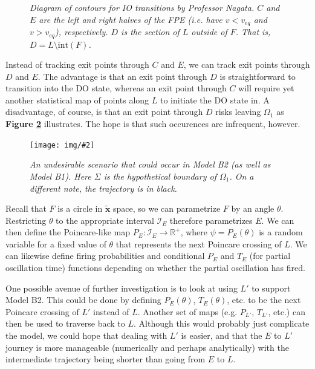 \documentclass[letterpaper,12pt]{article}
\numberwithin{table}{section}
\numberwithin{figure}{section}
\numberwithin{equation}{section}
\newcommand{\centerfig}[2]{\begin{center}\texttt{[image: img/\#2]}\end{center}}
\newcommand{\ccaption}[1]{\caption{\textit{#1}}}
\newcommand{\reffig}[1]{\textbf{Figure \ref{#1}}}
\begin{document}
\begin{flushleft}
\begin{figure}[h]
        \captionsetup{width=0.9\linewidth}
        \ccaption{Diagram of contours for IO transitions by Professor Nagata. $C$ and $E$ are the left and right halves of the FPE (i.e. have $v < v_{eq}$ and $v > v_{eq}$), respectively. $D$ is the section of $L$ outside of $F$. That is, $D = L \setminus \text{int}(F)$.}
        \label{fig:fpe-dissect}
    
    \end{figure}
    
    Instead of tracking exit points through $C$ and $E$, we can track exit points through $D$ and $E$. The advantage is that an exit point through $D$ is straightforward to transition into the DO state, whereas an exit point through $C$ will require yet another statistical map of points along $L$ to initiate the DO state in. A disadvantage, of course, is that an exit point through $D$ risks leaving $\Omega_1$ as \reffig{fig:modelb2-fpe-fail} illustrates. The hope is that such occurences are infrequent, however.
    \begin{figure}[h]

        \centering
 
        \centerfig{0.8}{modelb2-fpe-fail.jpg}
    
        \captionsetup{width=0.8\linewidth}
        \ccaption{An undesirable scenario that could occur in Model B2 (as well as Model B1). Here $\Sigma$ is the hypothetical boundary of $\Omega_1$. On a different note, the trajectory is in black.}
        \label{fig:modelb2-fpe-fail}
    
    \end{figure}

    Recall that $F$ is a circle in $\tilde{\mathbf{x}}$ space, so we can parametrize $F$ by an angle $\theta$. Restricting $\theta$ to the appropriate interval $\mathcal{I}_E$ therefore parametrizes $E$. We can then define the Poincare-like map $P_E : \mathcal{I}_E \to \mathbb{R}^+$, where $\psi = P_E(\theta)$ is a random variable for a fixed value of $\theta$ that represents the next Poincare crossing of $L$. We can likewise define firing probabilities and conditional $P_E$ and $T_E$ (for partial oscillation time) functions depending on whether the partial oscillation has fired.

    One possible avenue of further investigation is to look at using $L'$ to support Model B2. This could be done by defining $P_E(\theta)$, $T_E(\theta)$, etc. to be the next Poincare crossing of $L'$ instead of $L$. Another set of maps (e.g. $P_{L'}$, $T_{L'}$, etc.) can then be used to traverse back to $L$. Although this would probably just complicate the model, we could hope that dealing with $L'$ is easier, and that the $E$ to $L'$ journey is more manageable (numerically and perhaps analytically) with the intermediate trajectory being shorter than going from $E$ to $L$.


\end{flushleft}
\end{document}
